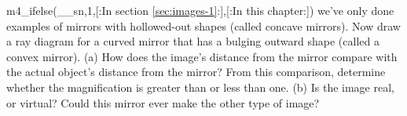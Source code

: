 m4_ifelse(__sn,1,[:In section \ref{sec:images-1}:],[:In this chapter:])
we've only done examples of mirrors with
hollowed-out shapes (called concave mirrors). Now draw a ray
diagram for a curved mirror that has a bulging outward shape
(called a convex mirror). (a) How does the image's distance
from the mirror compare with the actual object's distance
from the mirror? From this comparison, determine whether the
magnification is greater than or less than one. (b) Is the
image real, or virtual? Could this mirror ever make the
other type of image?
